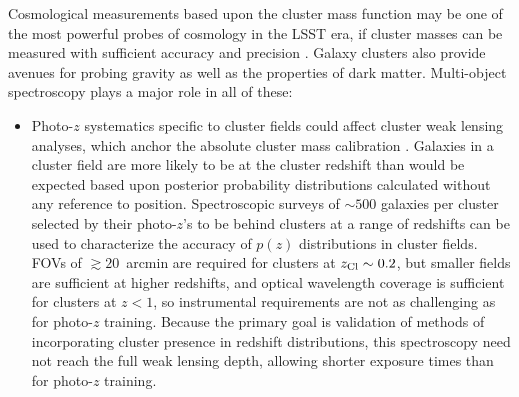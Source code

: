 Cosmological measurements based upon the cluster mass function may be one of the most powerful
probes of cosmology in the LSST era, if cluster masses can be measured with sufficient accuracy and
precision \citep{visions,Krause}.  Galaxy clusters also provide avenues for probing gravity as well as the properties of dark matter.  Multi-object spectroscopy plays a major role in all of these:

\begin{itemize}
\item Photo-$z$ systematics specific to cluster fields could affect cluster weak lensing analyses,
  which anchor the absolute cluster mass calibration \citep{Applegate}.  Galaxies in a cluster field
  are more likely to be at the cluster redshift than would be expected based upon posterior probability distributions calculated without any reference to position.  %
Spectroscopic surveys of $\sim 500$ galaxies per cluster selected by their photo-$z$'s to be behind clusters at
a range of redshifts can be used to
characterize the accuracy of $p(z)$ distributions in cluster fields.  FOVs of $\gtrsim 20$~arcmin are required for clusters at $z_{\rm
  Cl}\sim 0.2$, but smaller fields are sufficient at higher redshifts, and optical wavelength
coverage is sufficient for clusters at $z<1$, so instrumental requirements are not as challenging as
for photo-$z$ training.  
Because the primary goal is validation of methods of incorporating cluster presence in redshift
distributions, this spectroscopy need not reach the full weak lensing depth, allowing shorter
exposure times than for photo-$z$ training.


\end{itemize}
